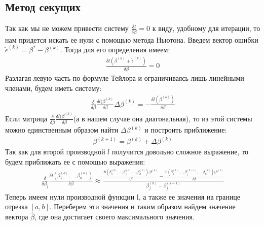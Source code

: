 \documentclass[12pt]{article}
\begin{document}
\subsection{Метод секущих}
Так как мы не можем привести систему $ \frac{\delta l}{\delta \beta}=0$ к виду, удобному для итерации, то нам придется искать ее нули с помощью метода Ньютона.
Введем вектор ошибки $\check{\epsilon}^{(k)}=\beta^{*}-\beta^{(k)}$. Тогда для его определения имеем:
\begin{eqnarray}
    \frac{\delta l (\beta^{(k)}+\check{\epsilon}^{(k)})}{\delta \beta}=0
\end{eqnarray}
Разлагая левую часть по формуле Тейлора и ограничиваясь лишь линейными членами\cite{NumericalMethods}, будем иметь систему:
\begin{eqnarray}
    \frac{\delta }{\delta \beta}\frac{\delta l (\beta^{(k)}}{\delta \beta}\Delta \beta^{(k)}=-\frac{\delta l (\beta^{(k)})}{\delta \beta}
\end{eqnarray}
Если матрица $\frac{\delta }{\delta \beta}\frac{\delta l (\beta^{(k)}}{\delta \beta}$(а в нашем случае она диагональная), то из этой системы можно единственным образом найти $\Delta \beta^{(k)}$ и построить приближение:
\begin{eqnarray}
    \beta^{(k+1)}=\beta^{(k)}+\Delta \beta^{(k)}
\end{eqnarray}
Так как для второй производной $l$ получится довольно сложное выражение, то будем приближать ее с помощью выражения:
\begin{eqnarray}
    \frac{\delta }{\delta \beta_j}\frac{\delta l(\beta_1^{(k)},\dots, \beta_n^{(k)}) }{\delta \beta}\approx \frac{\frac{\delta l(\beta_1^{(k)},\dots,\beta_j^{(k)},\dots, \beta_n^{(k)}) (\beta^{(k)}}{\delta \beta}-\frac{\delta l(\beta_1^{(k)},\dots,\beta_j^{(k-1)},\dots, \beta_n^{(k)}) (\beta^{(k)}}{\delta \beta}}{\beta_j^{(k)}-\beta_j^{(k-1)}}
\end{eqnarray}
Теперь имеем нули производной функции l, а также ее значения на границе отрезка $[a,b]$.
Переберем эти значения и таким образом найдем значение вектора $\hat{\beta}$, где она достигает своего максимального значения.
\end{document}
